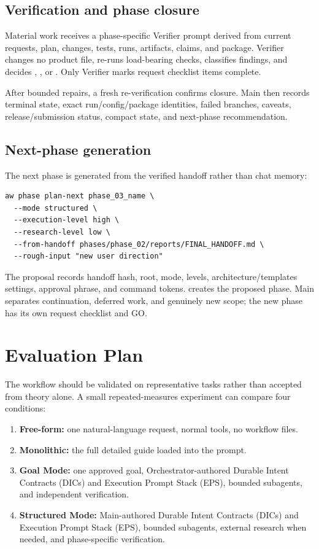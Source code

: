 \documentclass[11pt,a4paper]{article}
\newcommand{\code}[1]{\texttt{\detokenize{#1}}}
\begin{document}
\subsection{Verification and phase closure}\label{sec:phase-closure}

Material work receives a phase-specific Verifier prompt derived from current requests, plan,
changes, tests, runs, artifacts, claims, and package. Verifier changes no product file, re-runs
load-bearing checks, classifies findings, and decides \code{VERIFIED}, \code{REPAIR_REQUIRED}, or
\code{BLOCKED}. Only Verifier marks request checklist items complete.

After bounded repairs, a fresh re-verification confirms closure. Main then records terminal state,
exact run/config/package identities, failed branches, caveats, release/submission status, compact
state, and next-phase recommendation.

\subsection{Next-phase generation}

The next phase is generated from the verified handoff rather than chat memory:

\begin{lstlisting}[style=workflow]
aw phase plan-next phase_03_name \
  --mode structured \
  --execution-level high \
  --research-level low \
  --from-handoff phases/phase_02/reports/FINAL_HANDOFF.md \
  --rough-input "new user direction"
\end{lstlisting}

The proposal records handoff hash, root, mode, levels, architecture/templates settings, approval
phrase, and command tokens. \code{--create} creates the proposed phase. Main separates continuation,
deferred work, and genuinely new scope; the new phase has its own request checklist and GO.

\section{Evaluation Plan}\label{sec:evaluation}

The workflow should be validated on representative tasks rather than accepted from theory alone. A small repeated-measures experiment can compare four conditions:

\begin{enumerate}
  \item \textbf{Free-form:} one natural-language request, normal tools, no workflow files.
  \item \textbf{Monolithic:} the full detailed guide loaded into the prompt.
  \item \textbf{Goal Mode:} one approved goal, Orchestrator-authored Durable Intent Contracts (DICs) and Execution Prompt Stack (EPS), bounded subagents, and independent verification.
  \item \textbf{Structured Mode:} Main-authored Durable Intent Contracts (DICs) and Execution Prompt Stack (EPS), bounded subagents, external research when needed, and phase-specific verification.
\end{enumerate}
\end{document}
